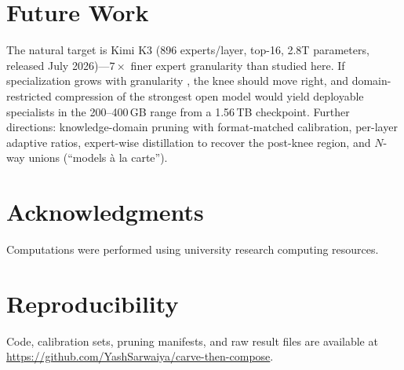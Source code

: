 \documentclass[11pt]{article}
\begin{document}
\section{Future Work}

The natural target is Kimi K3 (896 experts/layer, top-16, 2.8T parameters,
released July 2026)---$7\times$ finer expert granularity than studied here. If
specialization grows with granularity \cite{easyep}, the knee should move
right, and domain-restricted compression of the strongest open model would
yield deployable specialists in the 200--400\,GB range from a 1.56\,TB
checkpoint. Further directions: knowledge-domain pruning with format-matched
calibration, per-layer adaptive ratios, expert-wise distillation to recover the
post-knee region, and $N$-way unions (``models \`a la carte'').

\section*{Acknowledgments}

Computations were performed using university research computing resources.

\section*{Reproducibility}

Code, calibration sets, pruning manifests, and raw result files are available
at \url{https://github.com/YashSarwaiya/carve-then-compose}.
\end{document}
